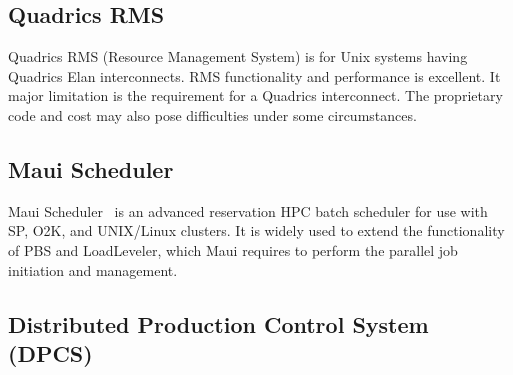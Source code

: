 %
%


\subsection{Quadrics RMS}

Quadrics RMS\cite{Quadrics02}
(Resource Management System) is for 
Unix systems having Quadrics Elan interconnects. 
RMS functionality and performance is excellent. 
It major limitation is the requirement for a Quadrics interconnect. 
The proprietary code and cost may also pose difficulties under some 
circumstances.


\subsection*{Maui Scheduler}

Maui Scheduler~\cite{Maui} is an advanced reservation HPC batch scheduler 
for use with SP, O2K, and UNIX/Linux clusters. 
It is widely used to extend the functionality of PBS and LoadLeveler, 
which Maui requires to perform the parallel job initiation and management.

\subsection*{Distributed Production Control System (DPCS)}

